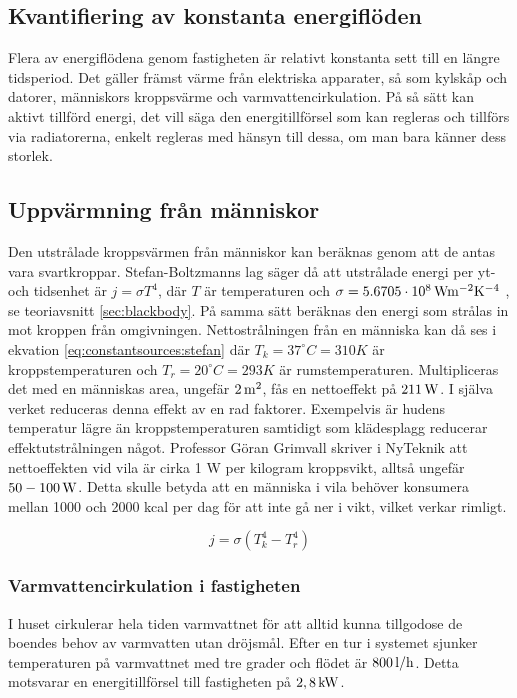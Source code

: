 \subsection{Kvantifiering av konstanta energiflöden}

Flera av energiflödena genom fastigheten är relativt konstanta sett till en längre tidsperiod. Det gäller främst värme från elektriska apparater, så som kylskåp och datorer, människors kroppsvärme och varmvattencirkulation. På så sätt kan aktivt tillförd energi, det vill säga den energitillförsel som kan regleras och tillförs via radiatorerna, enkelt regleras med hänsyn till dessa, om man bara känner dess storlek.

\subsection{Uppvärmning från människor}
Den utstrålade kroppsvärmen från människor kan beräknas genom att de antas vara svartkroppar. Stefan-Boltzmanns lag säger då att utstrålade energi per yt- och tidsenhet är $j=\sigma T^4$, där $T$ är temperaturen och $\sigma=\unit[5.6705\cdot 10^8]{Wm^{-2}K^{-4}}$ \cite{physicshandbook}, se teoriavsnitt \ref{sec:blackbody}. På samma sätt beräknas den energi som strålas in mot kroppen från omgivningen. Nettostrålningen från en människa kan då ses i ekvation \eqref{eq:constantsources:stefan} där $T_k=37^{\circ}C=310K$ är kroppstemperaturen och $T_r=20^{\circ}C=293K$ är rumstemperaturen. Multipliceras det med en människas area, ungefär $\unit[2]{m^2}$, fås en nettoeffekt på $\unit[211]{W}$. I själva verket reduceras denna effekt av en rad faktorer. Exempelvis är hudens temperatur lägre än kroppstemperaturen samtidigt som klädesplagg reducerar effektutstrålningen något. Professor Göran Grimvall skriver i NyTeknik att nettoeffekten vid vila är cirka 1 W per kilogram kroppsvikt, alltså ungefär $\unit[50-100]{W}$\cite{Grimvall}. Detta skulle betyda att en människa i vila behöver konsumera mellan 1000 och 2000 kcal per dag för att inte gå ner i vikt, vilket verkar rimligt.

\begin{equation}
\label{eq:constantsources:stefan}
j=\sigma \left( T_k^4 - T_r^4 \right)
\end{equation}
\noindent

\subsubsection{Varmvattencirkulation i fastigheten}
I huset cirkulerar hela tiden varmvattnet för att alltid kunna tillgodose de boendes behov av varmvatten utan dröjsmål. Efter en tur i systemet sjunker temperaturen på varmvattnet med tre grader och flödet är $\unit[800]{l/h}$. Detta motsvarar en energitillförsel till fastigheten på $\unit[2,8]{kW}$.

